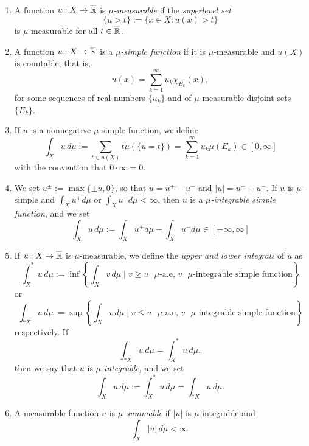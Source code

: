 \begin{definition}~
\begin{enumerate}[(1)]
\item A function $u : X \to \overline{\mathbb{R}}$ is \emph{$\mu$-measurable} if the {\em superlevel set} $$\{u > t\} := \{ x \in X : u(x) > t\}$$ 
is $\mu$-measurable for all $t\in \overline{\mathbb{R}}$.
\item A function $u : X \to \overline{\mathbb{R}}$ is a \emph{$\mu$-simple function} if it is $\mu$-measurable and $u(X)$ is
countable; that is, $$u(x) = \sum_{k=1}^\infty u_k \chi_{E_k}(x),$$
for some sequences of real numbers $\{u_{k}\}$ and of $\mu$-measurable disjoint sets $\{E_{k}\}$.
\item If $u$ is a nonnegative $\mu$-simple function, we define 
\[
\int_X u \, d\mu := \sum_{t \in u(X)} t\mu(\{u=t\}) = \sum_{k=1}^\infty u_k
\mu(E_k) \in [0,\infty]
\]
with the convention that $0 \cdot \infty = 0$.
\item We set $u^\pm := \max\{\pm u, 0 \}$, so that $u = u^+ - u^-$ and $|u| = u^{+} + u^{-}$. 
If $u$ is $\mu$-simple and $\int_X u^+ d\mu$ or $\int_X u^- d\mu < \infty$, then $u$ is a {\em $\mu$-integrable simple function}, and we set
\begin{equation*} 
\int_X u \, d\mu := \int_X u^+ d\mu - \int_X u^- d\mu \in [-\infty,\infty]
\end{equation*}
\item If $u : X \to \overline{\mathbb{R}}$ is $\mu$-measurable, we define the {\em upper and lower integrals} of $u$
as
\[
\int^*_X u \, d\mu := \inf \left\{ \int_X v \, d\mu \mid 
\text{$v \geq u$ $\mu$-a.e, $v$ $\mu$-integrable simple function}
\right\}
\]
or
\[
\int_{* X} u \, d\mu := \sup\left\{ \int_X v \, d\mu \mid 
\text{$v \leq u$ $\mu$-a.e, $v$ $\mu$-integrable simple function}
\right\}
\]
respectively. 
If
\[
\int_{* X} u \, d\mu = \int^*_X u \, d\mu,
\]
then we say that $u$ is {\em $\mu$-integrable}, and we set
\begin{equation*}
\int_{X} u \, d \mu := \int^*_X u \, d\mu = \int_{* X} u \, d\mu.
\end{equation*}
\item A measurable function $u$ is \emph{$\mu$-summable} if $|u|$ is
$\mu$-integrable and 
\[
\int_X |u| \, d\mu < \infty.
\]
\end{enumerate}
\end{definition}


